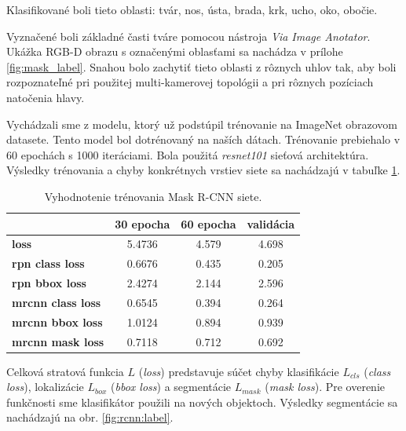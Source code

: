 \noindent Klasifikované boli tieto oblasti: tvár, nos, ústa, brada, krk, ucho, oko, obočie. \newline

Vyznačené boli základné časti tváre pomocou nástroja \textit{Via Image Anotator}. Ukážka RGB-D obrazu s označenými oblasťami sa nachádza v prílohe \ref{fig:mask_label}. Snahou bolo zachytiť tieto oblasti z rôznych uhlov tak, aby boli rozpoznateľné pri použitej multi-kamerovej topológii a pri rôznych pozíciach natočenia hlavy. 

Vychádzali sme z modelu, ktorý už podstúpil trénovanie na ImageNet obrazovom datasete. Tento model bol dotrénovaný na naších dátach. Trénovanie prebiehalo v 60 epochách s  1000 iteráciami. Bola použitá \textit{resnet101} sieťová architektúra. Výsledky trénovania a chyby konkrétnych vrstiev siete sa nachádzajú v tabuľke \ref{tab:rcnn:results}. 

\begin{table}[h]
	\caption{\label{tab:rcnn:results} Vyhodnotenie trénovania Mask R-CNN siete.}
	\centering
	\begin{tabular}{lccc}
		\toprule
		\textbf{} & \textbf{30 epocha} & \textbf{60 epocha} & \textbf{validácia} \\ 
		\midrule
		\textbf{loss} 					& 5.4736 	& 4.579 & 4.698	\\
		\textbf{rpn class loss} 		& 0.6676 	& 0.435 & 0.205	\\
		\textbf{rpn bbox loss} 			& 2.4274	& 2.144 & 2.596	\\
		\textbf{mrcnn class loss} 		& 0.6545	& 0.394 & 0.264	\\
		\textbf{mrcnn bbox loss} 		& 1.0124	& 0.894	& 0.939	\\
		\textbf{mrcnn mask loss} 		& 0.7118	& 0.712	& 0.692	\\
		\bottomrule
	\end{tabular}
\end{table}

Celková stratová funkcia $L$ (\textit{loss}) predstavuje súčet chyby klasifikácie $L_{cls}$ (\textit{class loss}), lokalizácie $L_{box}$ (\textit{bbox loss}) a segmentácie $ L_{mask}$ (\textit{mask loss}). Pre overenie funkčnosti sme klasifikátor použili na nových objektoch. Výsledky segmentácie sa nachádzajú na obr. \ref{fig:rcnn:label}.


